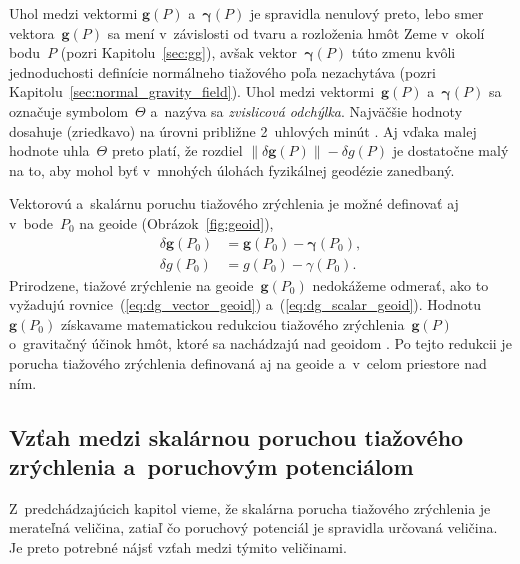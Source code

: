 \documentclass[a4paper, 12pt]{book}
\let\vec\mathbf
\begin{document}
Uhol medzi vektormi $\vec g(P)$ a~$\boldsymbol{\gamma}(P)$ je spravidla 
nenulový preto, lebo smer vektora~$\vec g(P)$ sa mení v~závislosti od tvaru 
a rozloženia hmôt Zeme v~okolí bodu~$P$ (pozri Kapitolu~\ref{sec:gg}), avšak 
vektor~$\boldsymbol \gamma(P)$ túto zmenu kvôli jednoduchosti definície 
normálneho tiažového poľa nezachytáva (pozri 
Kapitolu~\ref{sec:normal_gravity_field}).  Uhol medzi vektormi~$\vec g(P)$ 
a~$\boldsymbol \gamma(P)$ sa označuje symbolom~$\Theta$ a~nazýva sa 
\emph{zvislicová odchýlka}.  Najväčšie hodnoty dosahuje (zriedkavo) na úrovni 
približne 2~uhlových minút \parencite{GGMplus}.  Aj vďaka malej hodnote 
uhla~$\Theta$ preto platí, že rozdiel $\| \delta \vec g(P) \| - \delta g(P)$ je 
dostatočne malý na to, aby mohol byť v~mnohých úlohách fyzikálnej geodézie 
zanedbaný.

Vektorovú a~skalárnu poruchu tiažového zrýchlenia je možné definovať aj 
v~bode~$P_0$ na geoide (Obrázok~\ref{fig:geoid}),
%
\begin{align}
\label{eq:dg_vector_geoid}
\delta \vec g(P_0) &= \vec g(P_0) - \boldsymbol \gamma(P_0){,}\\
%
\label{eq:dg_scalar_geoid}
\delta g(P_0) &= g(P_0) - \gamma(P_0){.}
\end{align}
%
Prirodzene, tiažové zrýchlenie na geoide~$\vec g(P_0)$ nedokážeme odmerať, ako 
to vyžadujú rovnice~(\ref{eq:dg_vector_geoid}) a~(\ref{eq:dg_scalar_geoid}).  
Hodnotu~$\vec g(P_0)$ získavame matematickou redukciou tiažového 
zrýchlenia~$\vec g(P)$ o~gravitačný účinok hmôt, ktoré sa nachádzajú nad 
geoidom \parencite[pozri][]{Janak2006}.  Po tejto redukcii je porucha tiažového 
zrýchlenia definovaná aj na geoide a~v~celom priestore nad ním.


\subsection{Vzťah medzi skalárnou poruchou tiažového zrýchlenia a~poruchovým 
potenciálom}

Z~predchádzajúcich kapitol vieme, že skalárna porucha tiažového zrýchlenia je 
merateľná veličina, zatiaľ čo poruchový potenciál je spravidla určovaná 
veličina.  Je preto potrebné nájsť vzťah medzi týmito veličinami.
\end{document}
